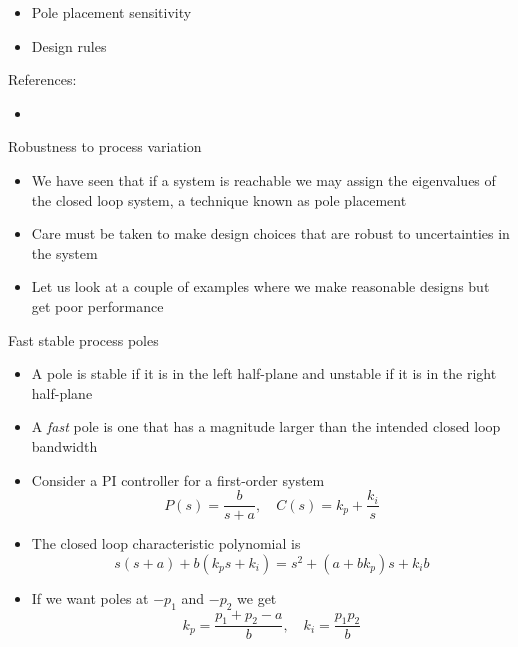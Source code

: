 \documentclass{beamer-control}
\begin{document}

\begin{SUMMARY}
\begin{itemize}
\item Pole placement sensitivity
\item Design rules
\end{itemize}
\vfill References:
\begin{itemize}
\item {}
\end{itemize}
\end{SUMMARY}




\begin{frame}{Robustness to process variation}
\begin{itemize}
\item We have seen that if a system is reachable we may assign the eigenvalues of the closed loop system, a technique known as pole placement
\item Care must be taken to make design choices that are robust to uncertainties in the system
\item Let us look at a couple of examples where we make reasonable designs but get poor performance
\end{itemize}
\end{frame}


\begin{frame}{Fast stable process poles}
\begin{itemize}
\item A pole is stable if it is in the left half-plane and unstable if it is in the right half-plane
\item A \textit{fast} pole is one that has a magnitude larger than the intended closed loop bandwidth
\item Consider a PI controller for a first-order system
\[P(s) = \frac{b}{s+a}, \quad C(s)=k_p+\frac{k_i}{s}\]
\item The closed loop characteristic polynomial is 
\[s(s+a)+b(k_ps+k_i)=s^2+(a+bk_p)s+k_ib\]
\item If we want poles at $-p_1$ and $-p_2$ we get
\[k_p=\frac{p_1+p_2-a}{b}, \quad k_i=\frac{p_1p_2}{b}\]
\end{itemize}
\end{frame}
\end{document}
